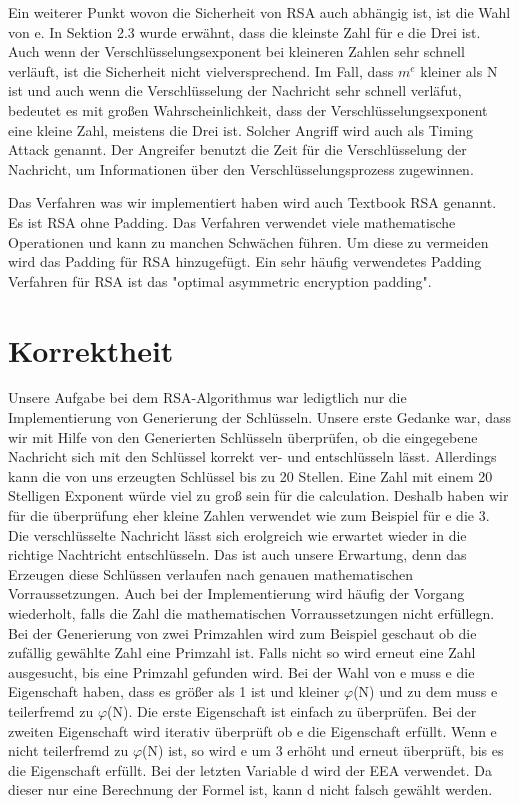 \documentclass[course=asp]{aspdoc}
\begin{document}
Ein weiterer Punkt wovon die Sicherheit von RSA auch abhängig ist, ist die Wahl von e. In Sektion 2.3 wurde erwähnt, dass die kleinste Zahl für e die Drei ist. Auch wenn der Verschlüsselungsexponent bei kleineren Zahlen sehr schnell verläuft, ist die Sicherheit nicht vielversprechend. Im Fall, dass $m^{e}$ kleiner als N ist und auch wenn die Verschlüsselung der Nachricht sehr schnell verläfut, bedeutet es mit großen Wahrscheinlichkeit, dass der Verschlüsselungsexponent eine kleine Zahl, meistens die Drei ist. Solcher Angriff wird auch als Timing Attack genannt. Der Angreifer benutzt die Zeit für die Verschlüsselung der Nachricht, um Informationen über den Verschlüsselungsprozess zugewinnen. \cite{TheRSAAlgorithm}

Das Verfahren was wir implementiert haben wird auch Textbook RSA genannt. Es ist RSA ohne Padding. Das Verfahren verwendet viele mathematische Operationen und kann zu manchen Schwächen führen. Um diese zu vermeiden wird das Padding für RSA hinzugefügt.  Ein sehr häufig verwendetes Padding Verfahren für RSA ist das "optimal asymmetric encryption padding". \cite{DefinitionoftextbookRSA}




\section{Korrektheit}
Unsere Aufgabe bei dem RSA-Algorithmus war ledigtlich nur die Implementierung von Generierung der Schlüsseln. Unsere erste Gedanke war, dass wir mit Hilfe von den Generierten Schlüsseln überprüfen, ob die eingegebene Nachricht sich mit den Schlüssel korrekt ver- und entschlüsseln lässt. Allerdings kann die von uns erzeugten Schlüssel bis zu 20 Stellen. Eine Zahl mit einem 20 Stelligen Exponent würde viel zu groß sein für die calculation. Deshalb haben wir für die überprüfung eher kleine Zahlen verwendet wie zum Beispiel für e die 3. Die verschlüsselte Nachricht lässt sich erolgreich wie erwartet wieder in die richtige Nachtricht entschlüsseln. Das ist auch unsere Erwartung, denn das Erzeugen diese Schlüssen verlaufen nach genauen mathematischen Vorraussetzungen. Auch bei der Implementierung wird häufig der Vorgang wiederholt, falls die Zahl die mathematischen Vorraussetzungen nicht erfüllegn. Bei der Generierung von zwei Primzahlen wird zum Beispiel geschaut ob die zufällig gewählte Zahl eine Primzahl ist. Falls nicht so wird erneut eine Zahl ausgesucht, bis eine Primzahl gefunden wird. Bei der Wahl von e muss e die Eigenschaft haben, dass es größer als 1 ist und kleiner $\varphi $(N) und zu dem muss e teilerfremd zu $\varphi $(N). Die erste Eigenschaft ist einfach zu überprüfen. Bei der zweiten Eigenschaft wird iterativ überprüft ob e die Eigenschaft erfüllt. Wenn e nicht teilerfremd zu $\varphi $(N) ist, so wird e um 3 erhöht und erneut überprüft, bis es die Eigenschaft erfüllt. Bei der letzten Variable d wird der EEA verwendet. Da dieser nur eine Berechnung der Formel ist, kann d nicht falsch gewählt werden.
\end{document}
